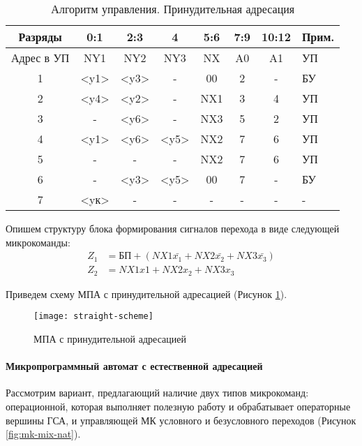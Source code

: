 \documentclass[a4paper,14pt]{extarticle}
\begin{document}
\begin{table}[htbp]
		\centering
		\caption{Алгоритм управления. Принудительная адресация }
	\begin{tabular}{|c|c|c|c|c|c|c|l|}

		\hline
		Разряды & 0:1 & 2:3 & 4 & 5:6 & 7:9 & 10:12 & Прим. \\ \hline
		Адрес в УП & NY1 & NY2 & NY3 & NX & A0 & A1 & УП \\ \hline
		1 & <y1> & <y3> & - & 00 & 2 & - & БУ \\ \hline
		2 & <y4> & <y2> & - & NX1 & 3 & 4 & УП \\ \hline
		3 & - & <y6> & - & NX3 & 5 & 2 & УП \\ \hline
		4 & <y1> & <y6> & <y5> & NX2 & 7 & 6 & УП \\ \hline
		5 & - & - & - & NX2 & 7 & 6 & УП \\ \hline
		6 & - & <y3> & <y5> & 00 & 7 & - & БУ \\ \hline
		7 & <yк> & - & - & - & - & - &  -\\ \hline
	\end{tabular}

	\label{tab:manage-algorithm}
\end{table}




Опишем структуру блока формирования сигналов перехода в виде следующей
микрокоманды:
\begin{align*}
	Z_1 & = БП + \left(NX1\bar{x_1}+NX2\bar{x_2}+NX3\bar{x_3}\right) \\
	Z_2 & = NX1x1+NX2x_2+NX3x_3
\end{align*}


Приведем схему МПА с принудительной адресацией (Рисунок \ref{fig:straight-scheme}).
\begin{figure}[h!]
	\centering
	\texttt{[image: straight-scheme]}
	\caption{МПА с принудительной адресацией}
	\label{fig:straight-scheme}
\end{figure}


\newpage
\paragraph{Микропрограммный автомат с естественной адресацией}
Рассмотрим вариант, предлагающий наличие двух типов микрокоманд: операционной, которая выполняет полезную работу и обрабатывает операторные
вершины ГСА, и управляющей МК условного и безусловного переходов (Рисунок \ref{fig:mk-mix-nat}).
\end{document}
